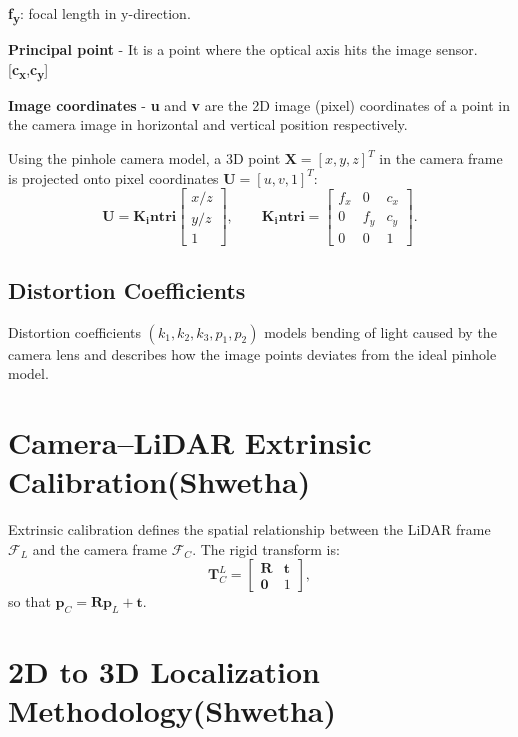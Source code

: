 \documentclass[12pt,a4paper]{report}
\begin{document}
\textbf{f\textsubscript{y}}: focal length in y-direction.

\textbf{Principal point} - It is a point where the optical axis hits the image sensor. [{\textbf{c\textsubscript{x}}},{\textbf{c\textsubscript{y}}}]

\textbf{Image coordinates} - {\textbf{u}} and {\textbf{v}} are the 2D image (pixel) coordinates of a point in the camera image in horizontal and vertical position respectively.

Using the pinhole camera model, a 3D point $\mathbf{X}=[x,y,z]^T$ in the camera frame is projected onto pixel coordinates $\mathbf{U}=[u,v,1]^T$:
\begin{equation}
\mathbf{U} = \mathbf{K_intri}
\begin{bmatrix}
x/z \\
y/z \\
1
\end{bmatrix},
\qquad
\mathbf{K_intri}=
\begin{bmatrix}
f_x & 0 & c_x \\
0 & f_y & c_y \\
0 & 0 & 1
\end{bmatrix}.
\end{equation}

\subsection{Distortion Coefficients}
Distortion coefficients $(k_1,k_2,k_3,p_1,p_2)$ models bending of light caused by the camera lens and describes how the image points deviates from the ideal pinhole model.


\section{Camera--LiDAR Extrinsic Calibration(Shwetha)}
Extrinsic calibration defines the spatial relationship between the LiDAR frame $\mathcal{F}_L$ and the camera frame $\mathcal{F}_C$. The rigid transform is:
\begin{equation}
\mathbf{T}_{C}^{L}=
\begin{bmatrix}
\mathbf{R} & \mathbf{t} \\
\mathbf{0} & 1
\end{bmatrix},
\end{equation}
so that $\mathbf{p}_C=\mathbf{R}\mathbf{p}_L+\mathbf{t}$. 

\section{2D to 3D Localization Methodology(Shwetha)}
\end{document}
